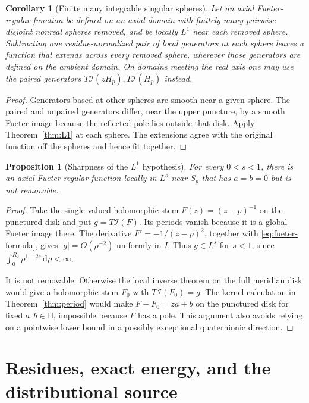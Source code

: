 \documentclass[11pt,a4paper]{article}
\numberwithin{equation}{section}
\newtheorem{proposition}[theorem]{Proposition}
\newtheorem{corollary}[theorem]{Corollary}
\theoremstyle{definition}
\theoremstyle{remark}
\newcommand{\HH}{\mathbb H}
\newcommand{\dd}{\,\mathrm d}
\newcommand{\cI}{\mathcal I}
\begin{document}
\begin{corollary}[Finite many integrable singular spheres]\label{cor:many}
Let an axial Fueter-regular function be defined on an axial domain with
finitely many pairwise disjoint nonreal spheres removed, and be locally
$L^1$ near each removed sphere. Subtracting one residue-normalized pair of
local generators at each sphere leaves a function that extends across every
removed sphere, wherever those generators are defined on the ambient domain.
On domains meeting the real axis one may use the paired generators
$T\cI(zH_p),T\cI(H_p)$ instead.
\end{corollary}
\begin{proof}
Generators based at other spheres are smooth near a given sphere. The
paired and unpaired generators differ, near the upper puncture, by a smooth
Fueter image because the reflected pole lies outside that disk. Apply
Theorem~\ref{thm:L1} at each sphere. The extensions agree with the original
function off the spheres and hence fit together.
\end{proof}

\begin{proposition}[Sharpness of the $L^1$ hypothesis]\label{prop:L1sharp}
For every $0<s<1$, there is an axial Fueter-regular function locally in
$L^s$ near $S_p$ that has $a=b=0$ but is not removable.
\end{proposition}
\begin{proof}
Take the single-valued holomorphic stem $F(z)=(z-p)^{-1}$ on the punctured
disk and put $g=T\cI(F)$. Its periods vanish because it is a global Fueter
image there. The derivative $F'=-1/(z-p)^2$, together with
\eqref{eq:fueter-formula}, gives $|g|=O(\rho^{-2})$ uniformly in $I$.
Thus $g\in L^s$ for $s<1$, since
$\int_0^{R_0}\rho^{1-2s}\dd\rho<\infty$.

It is not removable. Otherwise the local inverse theorem on the full
meridian disk would give a holomorphic stem $F_0$ with
$T\cI(F_0)=g$. The kernel calculation in Theorem~\ref{thm:period} would make
$F-F_0=za+b$ on the punctured disk for fixed $a,b\in\HH$, impossible because
$F$ has a pole. This argument also avoids relying on a pointwise lower bound
in a possibly exceptional quaternionic direction.
\end{proof}

\section{Residues, exact energy, and the distributional source}
\label{sec:energy}
\end{document}
